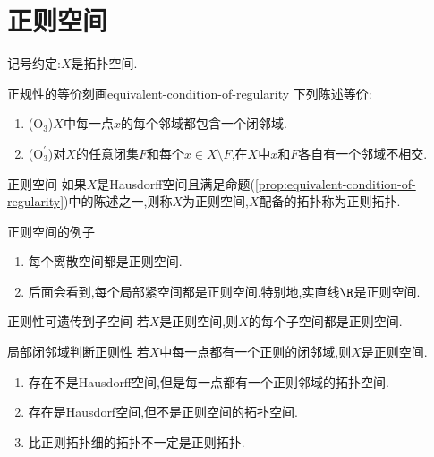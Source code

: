 \section{正则空间}

记号约定:$X$是拓扑空间.

\begin{proposition}{正规性的等价刻画}{equivalent-condition-of-regularity}
	下列陈述等价:
	\begin{enumerate}
		\item ($\mathrm{O}_{3}$)$X$中每一点$x$的每个邻域都包含一个闭邻域.
		\item ($\mathrm{O}_{3}^{\prime}$)对$X$的任意闭集$F$和每个$x\in X\setminus F$,在$X$中$x$和$F$各自有一个邻域不相交.
	\end{enumerate}
\end{proposition}

\begin{definition}{正则空间}{}
	如果$X$是Hausdorff空间且满足命题(\ref{prop:equivalent-condition-of-regularity})中的陈述之一,则称$X$为正则空间,$X$配备的拓扑称为正则拓扑.
\end{definition}

\begin{example}{正则空间的例子}{}
	\begin{enumerate}
		\item 每个离散空间都是正则空间.
		\item 后面会看到,每个局部紧空间都是正则空间.特别地,实直线$\R$是正则空间.
	\end{enumerate}
\end{example}

\begin{proposition}{正则性可遗传到子空间}{}
	若$X$是正则空间,则$X$的每个子空间都是正则空间.
\end{proposition}

\begin{proposition}{局部闭邻域判断正则性}{}
	若$X$中每一点都有一个正则的闭邻域,则$X$是正则空间.
\end{proposition}

\begin{remark}{}{}
	\begin{enumerate}
		\item 存在不是Hausdorff空间,但是每一点都有一个正则邻域的拓扑空间.
		\item 存在是Hausdorf空间,但不是正则空间的拓扑空间.
		\item 比正则拓扑细的拓扑不一定是正则拓扑.
	\end{enumerate}
\end{remark}


















